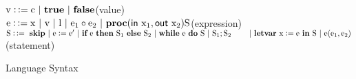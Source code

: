 \documentclass{llncs}
\begin{document}
\begin{figure}[t]
\parbox[t]{4.8in}{\footnotesize
$\mathrm{v \mathrel{\mathop:\mathop:}= c\ \arrowvert\ \textbf{true}\ \arrowvert\ \textbf{false}}$\hfill(value)\\
$\mathrm{e \mathrel{\mathop:\mathop:}= x\ \arrowvert\ v\ \arrowvert\
l\ \arrowvert\ e_1\circ
e_2\ \arrowvert\ \textbf{proc}(\textsf{in}\ x_1, \textsf{out}\ x_2)S}$\hspace*{\fill}(expression)\\
$\mathrm{S \mathrel{\mathop:\mathop:}=\ \textbf{skip}\ \arrowvert\ e
\mathrel{\mathop:}= e'\ \arrowvert\ \textbf{if}\ e\ \textbf{then}\
S_1\ \textbf{else}\ S_2}\
\mathrm{\arrowvert\ \textbf{while}\ e\ \textbf{do}\ S\ \arrowvert\ S_1;S_2}\\
\hspace*{0.8cm}\mathrm{\arrowvert\ \textbf{letvar}\
x\mathrel{\mathop:}= e\ \textbf{in}\ S\ \arrowvert\ e(e_1,
e_2)}$\hspace*{\fill}(statement)}
\caption{\label{fig:syntex}Language Syntax}
\end{figure}
\end{document}
